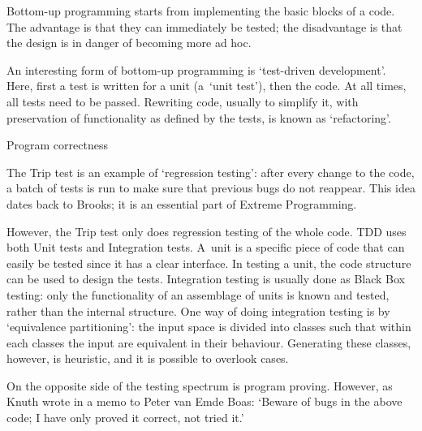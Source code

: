 Bottom-up programming starts from implementing the basic blocks of a
code. The advantage is that they can immediately be tested; the
disadvantage is that the design is in danger of becoming more ad
hoc.

An interesting form of bottom-up programming is `test-driven development'. Here, first a test is written
for a unit (a~`unit test'), then the code. At all
times, all tests need to be passed. Rewriting code, usually to
simplify it, with preservation of functionality as defined by the
tests, is known as `refactoring'.

 {Program correctness}

The Trip test is an example of `regression
testing': after every change to the code, a batch of tests is run to
make sure that previous bugs do not reappear. This idea dates back to
Brooks; it is an essential part of Extreme Programming.

However, the Trip test only does regression testing of the whole
code. TDD uses both Unit tests and Integration tests. A~unit is a
specific piece of code that can easily be tested since it has a clear
interface. In testing a unit, the code structure can be used to design
the tests. Integration testing is usually done as Black Box testing:
only the functionality of an assemblage of units is known and tested,
rather than the internal structure. One way of doing integration
testing is by `equivalence
partitioning': the input space is divided into classes such that
within each classes the input are equivalent in their
behaviour. Generating these classes, however, is heuristic, and it is
possible to overlook cases.

On the opposite side of the testing spectrum is program
proving. However, as Knuth wrote in a memo to Peter van Emde Boas:
`Beware of bugs in the above code; I have only proved it correct, not
tried it.'
